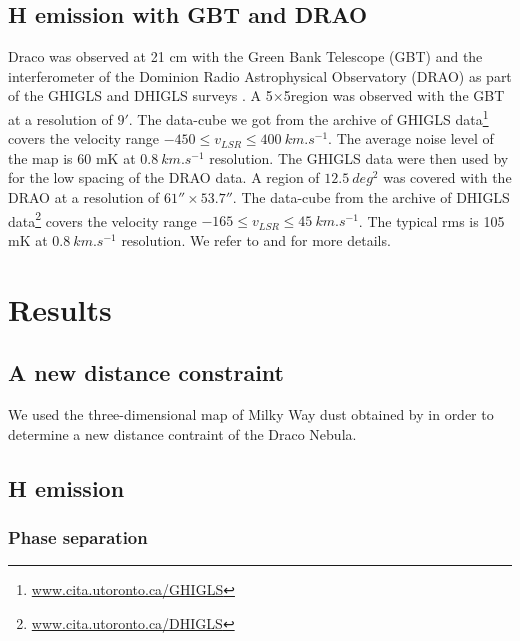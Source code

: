 \documentclass[traditabstract]{aa}
\begin{document}
   \subsection{H emission with GBT and DRAO}

   Draco was observed at 21 cm with the Green Bank Telescope (GBT) and the interferometer of the Dominion Radio Astrophysical Observatory (DRAO) as part of the GHIGLS and DHIGLS surveys \citep{Martin_2015,Blagrave_2017}.
A 5\degree$\times $5\degree region was observed with the GBT at a resolution of $9'$. The data-cube we got from the archive of GHIGLS data\footnote{\url{www.cita.utoronto.ca/GHIGLS}} covers the velocity range $-450\leq v_{LSR}\leq 400\: km.s^{-1}$. The average noise level of the map is 60 mK at $0.8\: km.s^{-1}$ resolution.
The GHIGLS data were then used by \cite{Blagrave_2017} for the low spacing of the DRAO data. A region of $12.5\: deg^2$ was covered with the DRAO at a resolution of $61''\times 53.7''$. The data-cube from the archive of DHIGLS data\footnote{\url{www.cita.utoronto.ca/DHIGLS}} covers the velocity range $-165\leq v_{LSR}\leq 45\: km.s^{-1}$. The typical rms is 105 mK at $0.8\: km.s^{-1}$ resolution.
We refer to \cite{Martin_2015} and \cite{Blagrave_2017} for more details.




\section{Results}
\label{sec:Res}

   \subsection{A new distance constraint}

We used the three-dimensional map of Milky Way dust obtained by \cite{Green_2015ApJ...810...25G} in order to determine 
a new distance contraint of the Draco Nebula. 


   \subsection{H emission}
   \label{sec:HI-data}

      \subsubsection{Phase separation}
\end{document}
